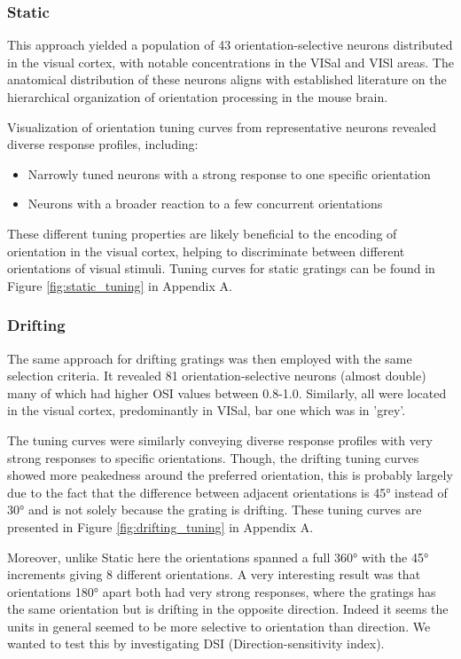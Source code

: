 \documentclass[10pt,twocolumn]{article}
\begin{document}
\subsubsection{Static}

This approach yielded a population of 43 orientation-selective neurons distributed in the visual cortex, with notable concentrations in the VISal and VISl areas. The anatomical distribution of these neurons aligns with established literature on the hierarchical organization of orientation processing in the mouse brain.

Visualization of orientation tuning curves from representative neurons revealed diverse response profiles, including:
\begin{itemize}
    \item Narrowly tuned neurons with a strong response to one specific orientation
    \item Neurons with a broader reaction to a few concurrent orientations
\end{itemize}

These different tuning properties are likely beneficial to the encoding of orientation in the visual cortex, helping to discriminate between different orientations of visual stimuli. Tuning curves for static gratings can be found in Figure \ref{fig:static_tuning} in Appendix A.

\subsubsection{Drifting}

The same approach for drifting gratings was then employed with the same selection criteria. It revealed 81 orientation-selective neurons (almost double) many of which had higher OSI values between 0.8-1.0. Similarly, all were located in the visual cortex, predominantly in VISal, bar one which was in 'grey'.

The tuning curves were similarly conveying diverse response profiles with very strong responses to specific orientations. Though, the drifting tuning curves showed more peakedness around the preferred orientation, this is probably largely due to the fact that the difference between adjacent orientations is 45° instead of 30° and is not solely because the grating is drifting. These tuning curves are presented in Figure \ref{fig:drifting_tuning} in Appendix A.

Moreover, unlike Static here the orientations spanned a full 360° with the 45° increments giving 8 different orientations. A very interesting result was that orientations 180° apart both had very strong responses, where the gratings has the same orientation but is drifting in the opposite direction. Indeed it seems the units in general seemed to be more selective to orientation than direction. We wanted to test this by investigating DSI (Direction-sensitivity index).
\end{document}

